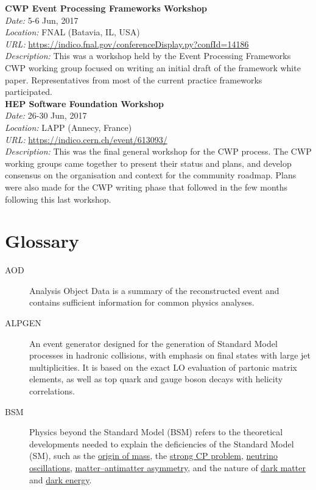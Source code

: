 \documentclass[twocolumn]{svjour3}          %
\begin{document}
\begin{appendices}
\noindent
\textbf{CWP Event Processing Frameworks Workshop}\\
\emph{Date:} 5-6 Jun, 2017\\
\emph{Location:} FNAL (Batavia, IL, USA)\\
\emph{URL:}
\href{https://indico.fnal.gov/conferenceDisplay.py?confId=14186}{{https://indico.fnal.gov/conferenceDisplay.py?confId=14186}}\\
\emph{Description:} This was a workshop held by the Event Processing Frameworks
CWP working group focused on writing an initial draft of the framework
white paper. Representatives from most of the current practice
frameworks participated.\\

\noindent
\textbf{HEP Software Foundation Workshop}\\
\emph{Date:} 26-30 Jun, 2017\\
\emph{Location:} LAPP (Annecy, France)\\
\emph{URL:}
\href{https://indico.cern.ch/event/613093/}{{https://indico.cern.ch/event/613093/}}\\
\emph{Description:} This was the final general workshop for the CWP
process. The CWP working groups came together to present their status
and plans, and develop consensus on the organisation and context for the
community roadmap. Plans were also made for the CWP writing phase that
followed in the few months following this last workshop.

\newpage
\hypertarget{appendix-b-glossary}{%
\section{Glossary}\label{appendix-b-glossary}}

\begin{description}

\item[AOD] Analysis Object Data is a summary of the reconstructed event and
contains sufficient information for common physics analyses.

\item[ALPGEN] An event generator designed for the generation of Standard Model
processes in hadronic collisions, with emphasis on final states with
large jet multiplicities. It is based on the exact LO evaluation of
partonic matrix elements, as well as top quark and gauge boson decays
with helicity correlations.

\item[BSM] Physics beyond the Standard Model (BSM) refers to the theoretical
developments needed to explain the deficiencies of the Standard Model
(SM), such as the
\href{https://en.wikipedia.org/wiki/Origin_of_mass}{origin of mass}, the
\href{https://en.wikipedia.org/wiki/Strong_CP_problem}{strong CP
problem},
\href{https://en.wikipedia.org/wiki/Neutrino_oscillation}{neutrino
oscillations},
\href{https://en.wikipedia.org/wiki/Baryon_asymmetry}{matter--antimatter
asymmetry}, and the nature of
\href{https://en.wikipedia.org/wiki/Dark_matter}{dark matter} and
\href{https://en.wikipedia.org/wiki/Dark_energy}{dark energy}.


\end{description}
\end{appendices}
\end{document}
